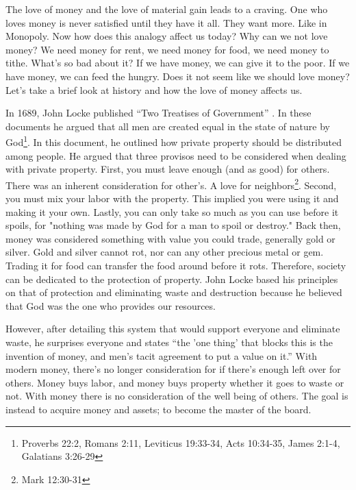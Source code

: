 \documentclass[11pt]{article}
\begin{document}
\begin{multicols}{2}
The love of money and the love of material gain leads to a craving. One who loves money is never satisfied until they have it all. They want more. Like in Monopoly. Now how does this analogy affect us today? Why can we not love money? We need money for rent, we need money for food, we need money to tithe. What’s so bad about it? If we have money, we can give it to the poor. If we have money, we can feed the hungry. Does it not seem like we should love money? Let’s take a brief look at history and how the love of money affects us.

In 1689, John Locke published ``Two Treatises of Government” \cite{TwoTreatises}. In these documents he argued that all men are created equal in the state of nature by God\footnote{Proverbs 22:2, Romans 2:11, Leviticus 19:33-34, Acts 10:34-35, James 2:1-4, Galatians 3:26-29}. In this document, he outlined how private property should be distributed among people. He argued that three provisos need to be considered when dealing with private property. First, you must leave enough (and as good) for others. There was an inherent consideration for other's. A love for neighbors\footnote{Mark 12:30-31}. Second, you must mix your labor with the property. This implied you were using it and making it your own. Lastly, you can only take so much as you can use before it spoils, for "nothing was made by God for a man to spoil or destroy." Back then, money was considered something with value you could trade, generally gold or silver. Gold and silver cannot rot, nor can any other precious metal or gem. Trading it for food can transfer the food around before it rots. Therefore, society can be dedicated to the protection of property. John Locke based his principles on that of protection and eliminating waste and destruction because he believed that God was the one who provides our resources.

However, after detailing this system that would support everyone and eliminate waste, he surprises everyone and states ``the 'one thing' that blocks this is the invention of money, and men's tacit agreement to put a value on it.” With modern money, there's no longer consideration for if there's enough left over for others. Money buys labor, and money buys property whether it goes to waste or not. With money there is no consideration of the well being of others. The goal is instead to acquire money and assets; to become the master of the board.


\end{multicols}
\end{document}
